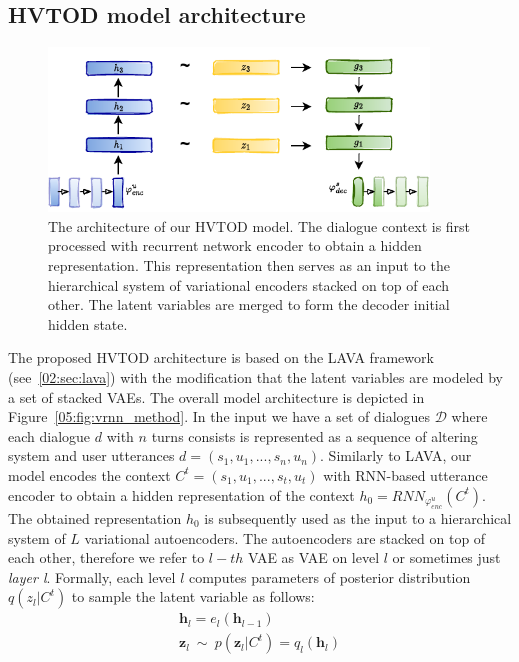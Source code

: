 \subsection{HVTOD model architecture}
\begin{figure}[h]
    \centering
    \includegraphics[width=0.9\textwidth]{images/HVTOD-full-noN.pdf}
    \caption{The architecture of our HVTOD model. The dialogue context is first processed with recurrent network encoder to obtain a hidden representation. This representation then serves as an input to the hierarchical system of variational encoders stacked on top of each other. The latent variables are merged to form the decoder initial hidden state.}
    \label{05:fig:HVTOD-full}
\end{figure}
The proposed HVTOD architecture is based on the LAVA framework (see~\ref{02:sec:lava}) with the modification that the latent variables are modeled by a set of stacked VAEs.
The overall model architecture is depicted in Figure~\ref{05:fig:vrnn_method}.
In the input we have a set of dialogues $\mathcal{D}$ where each dialogue $d$ with $n$ turns consists is represented as a sequence of altering system and user utterances $d = (s_1,u_1,...,s_n,u_n)$.
Similarly to LAVA, our model encodes the context $C^t = (s_1,u_1,...,s_t,u_t)$ with RNN-based utterance encoder to obtain a hidden representation of the context $h_0 = RNN_{\varphi_{enc}^u} (C^t)$.
The obtained representation $h_0$ is subsequently used as the input to a hierarchical system of $L$ variational autoencoders.
The autoencoders are stacked on top of each other, therefore we refer to $l-th$ VAE as VAE on level $l$ or sometimes just \emph{layer l}.
Formally, each level $l$ computes parameters of posterior distribution $q(z_l|C^t)$ to sample the latent variable as follows:
\begin{equation}
\begin{split}    
    \mathbf{h}_l = e_l(\mathbf{h}_{l-1}) \\
    \mathbf{z}_l~\mathtt{\sim}~p(\mathbf{z}_l|C^t) = q_l(\mathbf{h}_l) \\
\end{split}
\end{equation}
